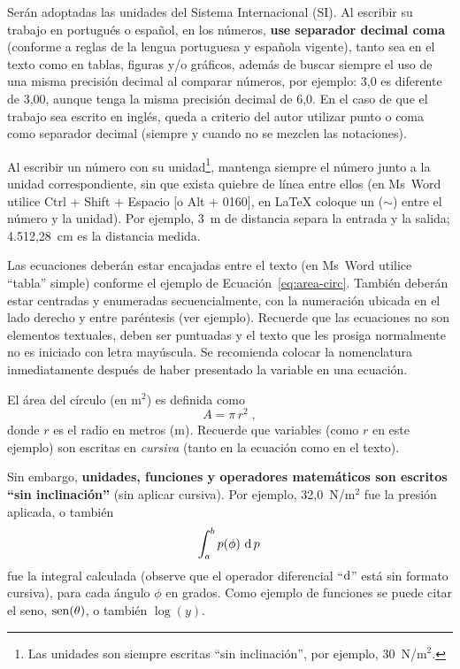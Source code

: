 \documentclass[12pt, a4paper, twoside, twocolumn]{article}
\begin{document}
Serán adoptadas las unidades del Sistema Internacional (SI). Al escribir su trabajo en portugués o español, en los números, \textbf{use separador decimal coma} (conforme a reglas de la lengua portuguesa y española vigente), tanto sea en el texto como en tablas, figuras y/o gráficos, además de buscar siempre el uso de una misma precisión decimal al comparar números, por ejemplo: 3,0 es diferente de 3,00, aunque tenga la misma precisión decimal de 6,0.
En el caso de que el trabajo sea escrito en inglés, queda a criterio del autor utilizar punto o coma como separador decimal (siempre y cuando no se mezclen las notaciones).

Al escribir un número con su unidad\footnote{Las unidades son siempre escritas ``sin inclinación'', por ejemplo, 30~N/m$^2$.}, mantenga siempre el número junto a la unidad correspondiente, sin que exista quiebre de línea entre ellos (en Ms~Word utilice Ctrl + Shift + Espacio [o Alt + 0160], en \LaTeX\xspace coloque un ($\sim$) entre el número y la unidad). Por ejemplo, 3~m de distancia separa la entrada y la salida; 4.512,28~cm es la distancia medida.

Las ecuaciones deberán estar encajadas entre el texto (en Ms~Word utilice ``tabla'' simple) conforme el ejemplo de Ecuación~\eqref{eq:area-circ}. También deberán estar centradas y enumeradas secuencialmente, con la numeración ubicada en el lado derecho y entre paréntesis (ver ejemplo). Recuerde que las ecuaciones no son elementos textuales, deben ser puntuadas y el texto que les prosiga normalmente no es iniciado con letra mayúscula. Se recomienda colocar la nomenclatura inmediatamente después de haber presentado la variable en una ecuación.

El área del círculo (en m$^2$) es definida como
%
\begin{equation}
	A = \pi \, r^2\;,
\label{eq:area-circ}
\end{equation}
%
donde $r$ es el radio en metros (m). Recuerde que variables (como $r$ en este ejemplo) son escritas en \textit{cursiva} (tanto en la ecuación como en el texto). 

Sin embargo, \textbf{unidades, funciones y operadores matemáticos son escritos ``sin inclinación''} (sin aplicar cursiva). Por ejemplo, 32,0~N/m$^2$ fue la presión aplicada, o también
%
\begin{equation}
	\int_a^b p(\phi)\, \operatorname{d} p\,
\label{eq:int}
\end{equation}
%
fue la integral calculada (observe que el operador diferencial ``$\text{d}$''  está sin formato cursiva), para cada ángulo $\phi$ en grados. Como ejemplo de funciones se puede citar el seno, $\operatorname{sen}(\theta)$, o también $\log(y)$.
\end{document}
